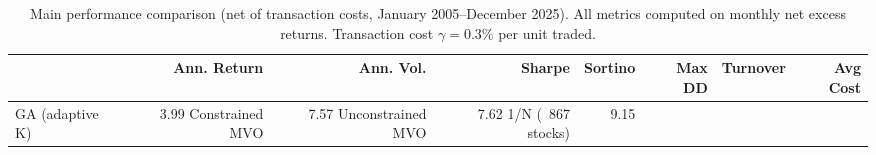 \begin{table}
\caption{Main performance comparison (net of transaction costs, January 2005--December 2025). All metrics computed on monthly net excess returns. Transaction cost $\gamma = 0.3\%$ per unit traded.}
\label{tab:performance}
\begin{tabular}{lrrrrrrr}
\toprule
 & Ann. Return & Ann. Vol. & Sharpe & Sortino & Max DD & Turnover & Avg Cost \\
\midrule
GA (adaptive K) & 3.99%
Constrained MVO & 7.57%
Unconstrained MVO & 7.62%
1/N (~867 stocks) & 9.15%
\bottomrule
\end{tabular}
\end{table}
